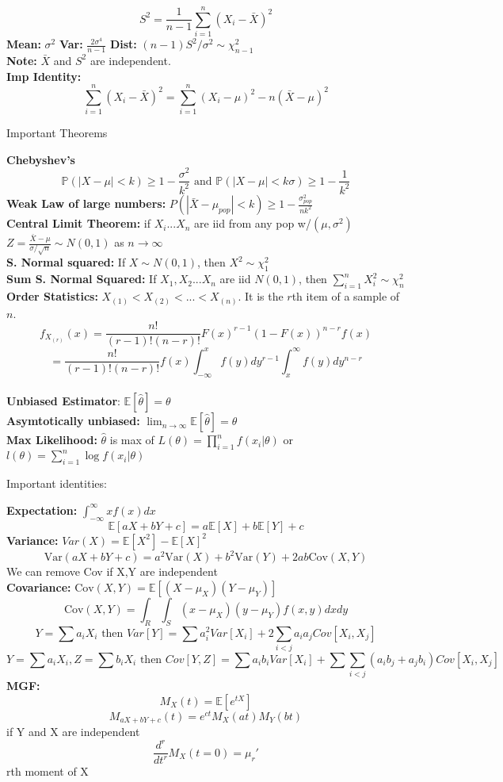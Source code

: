 \documentclass[a4paper,answers,12pt,addpoints]{exam}
\begin{document}
$$S^2 = \frac{1}{n-1}\sum_{i=1}^n (X_i - \bar{X})^2$$
\textbf{Mean:} $\sigma^2$ \textbf{Var:} $\frac{2\sigma^4}{n-1}$ \textbf{Dist:} $(n-1)S^2/\sigma^2 \sim \chi^2_{n-1}$\\
\textbf{Note:} $\bar{X}$ and $S^2$ are independent.\\
\textbf{Imp Identity:} 
$$\sum_{i=1}^n (X_i - \bar{X})^2 = \sum_{i=1}^n (X_i - \mu)^2 - n(\bar{X} - \mu)^2$$
\begin{center}
    Important Theorems
\end{center}
\textbf{Chebyshev's} 
$$\mathbb{P}(|X-\mu|< k) \geq 1 - \frac{\sigma^2}{k^2} \text{ and } \mathbb{P}(|X-\mu|< k\sigma) \geq 1 - \frac{1}{k^2}$$
\textbf{Weak Law of large numbers:} $P(|\bar{X} - \mu_{pop}| < k ) \geq 1 -\frac{\sigma^2_{pop}}{nk^2} $\\
\textbf{Central Limit Theorem:} if $X_i ... X_n$ are iid from any pop w/$(\mu, \sigma^2)$ $Z = \frac{\bar{X} - \mu}{\sigma/\sqrt{n}} \sim N(0,1)$ as $n \to \infty$\\
\textbf{S. Normal squared:} If $X \sim N(0,1)$, then $X^2 \sim \chi^2_1$\\
\textbf{Sum S. Normal Squared:} If $X_1, X_2 ... X_n$ are iid $N(0,1)$, then $\sum_{i=1}^n X_i^2 \sim \chi^2_n$\\
\textbf{Order Statistics:} $X_{(1)} < X_{(2)} < ... < X_{(n)}$. It is the $r$th item of a sample of $n$. 
$$f_{X_{(r)}}(x) = \frac{n!}{(r-1)!(n-r)!}F(x)^{r-1}(1-F(x))^{n-r}f(x)$$
$$=\frac{n!}{(r-1)!(n-r)!}f(x)\int_{-\infty}^x f(y)dy^{r-1}\int_x^\infty f(y)dy^{n-r}$$\\
\textbf{Unbiased Estimator}: $\mathbb{E}[\hat{\theta}] = \theta$\\
\textbf{Asymtotically unbiased:} $\lim_{n\to\infty} \mathbb{E}[\hat{\theta}] = \theta$\\
\textbf{Max Likelihood:} $\hat{\theta}$ is max of $L(\theta) = \prod_{i=1}^n f(x_i|\theta)$ or $l(\theta) = \sum_{i=1}^n \log f(x_i|\theta)$\\

\begin{center}
    Important identities:
\end{center}
\textbf{Expectation:} $\int_{-\infty}^\infty xf(x)dx$\\
$$\mathbb{E}[aX+bY+c] = a\mathbb{E}[X] + b\mathbb{E}[Y] + c$$
\textbf{Variance:}  $Var(X) = \mathbb{E}[X^2] - \mathbb{E}[X]^2$\\
$$\text{Var}(aX+bY+c) = a^2\text{Var}(X) + b^2\text{Var}(Y) + 2ab\text{Cov}(X,Y)$$
 We can remove Cov if X,Y are independent\\
\textbf{Covariance:} $\text{Cov}(X,Y) = \mathbb{E}[(X-\mu_X)(Y-\mu_Y)]$\\
$$\text{Cov}(X,Y) = \int_R \int_S (x-\mu_X)(y-\mu_Y)f(x,y)dxdy$$ 
$$Y = \sum a_i X_i \text{ then } Var[Y] = \sum a^2_i Var[X_i] + 2\sum_{i<j} a_ia_j Cov[X_i, X_j]$$ 
$$Y = \sum a_i X_i, Z = \sum b_i X_i \text{ then }Cov[Y,Z] = \sum a_ib_i Var[X_i] + \sum \sum_{i<j} (a_ib_j + a_jb_i) Cov[X_i, X_j]$$
\textbf{MGF:} 
$$M_X(t) = \mathbb{E}[e^{tX}]$$
$$M_{aX+bY+c}(t) = e^{ct}M_X(at)M_Y(bt)$$
if Y and X are independent \\
$$\frac{d^r}{dt^r} M_X(t = 0) = \mu_r' $$ rth moment of X\\ 
\end{document}
